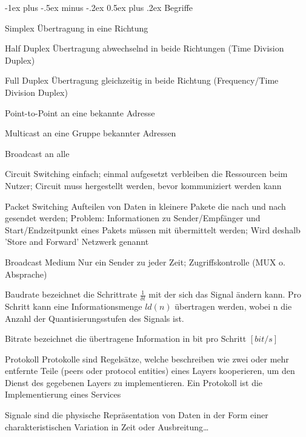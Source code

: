 \documentclass[10pt,landscape]{article}
\makeatletter
\renewcommand{\section}{\@startsection{section}{1}{0mm}%
                                {-1ex plus -.5ex minus -.2ex}%
                                {0.5ex plus .2ex}%
                                {\normalfont\large\bfseries}}
\makeatother
\begin{document}
\begin{multicols}{3}
    \section{Begriffe}
    \begin{description*}
        \item[Simplex] Übertragung in eine Richtung
        \item[Half Duplex] Übertragung abwechselnd in beide Richtungen (Time Division Duplex)
        \item[Full Duplex] Übertragung gleichzeitig in beide Richtung (Frequency/Time Division Duplex)
        \item[Point-to-Point] an eine bekannte Adresse
        \item[Multicast] an eine Gruppe bekannter Adressen
        \item[Broadcast] an alle
        \item[Circuit Switching] einfach; einmal aufgesetzt verbleiben die Ressourcen beim Nutzer; Circuit muss hergestellt werden, bevor kommuniziert werden kann
        \item[Packet Switching] Aufteilen von Daten in kleinere Pakete die nach und nach gesendet werden; Problem: Informationen zu Sender/Empfänger und Start/Endzeitpunkt eines Pakets müssen mit übermittelt werden; Wird deshalb 'Store and Forward' Netzwerk genannt
        \item[Broadcast Medium] Nur ein Sender zu jeder Zeit; Zugriffskontrolle (MUX o. Absprache)
        \item[Baudrate] bezeichnet die Schrittrate $\frac{1}{\delta t}$ mit der sich das Signal ändern kann. Pro Schritt kann eine Informationsmenge $ld(n)$ übertragen werden, wobei n die Anzahl der
        Quantisierungsstufen des Signals ist. %
        \item[Bitrate] bezeichnet die übertragene Information in bit pro Schritt $[bit/s]$
        \item[Protokoll] Protokolle sind Regelsätze, welche beschreiben wie zwei oder mehr entfernte Teile (peers oder protocol entities) eines Layers kooperieren, um den Dienst des gegebenen Layers zu implementieren. Ein Protokoll ist die Implementierung eines Services
        \item[Signale] sind die physische Repräsentation von Daten in der Form einer charakteristischen Variation in Zeit oder Ausbreitung…

\end{description*}
\end{multicols}
\end{document}
